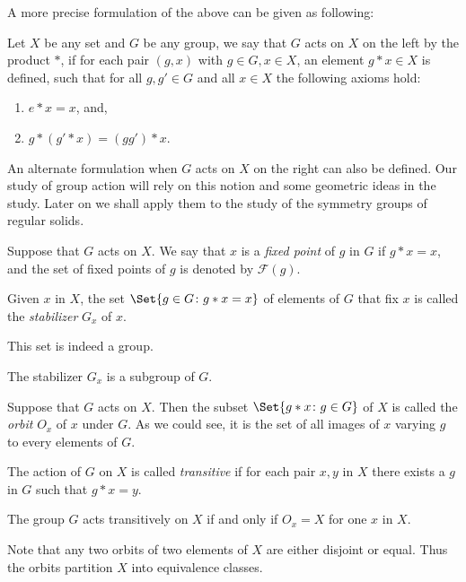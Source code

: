 \documentclass[main.tex]{subfiles}
\begin{document}
		A more precise formulation of the above can be given as following:
		\begin{definition}
			Let $X$ be any set and $G$ be any group, we say that $G$ acts on $X$ on the left by the product $\ast$, if for each pair $(g, x)$ with $g \in G, x \in X$, an element $g\ast x \in X$ is defined, such that for all $g, g' \in G$ and all $x \in X$ the following axioms hold:
			\begin{enumerate}
				\item $e\ast x = x$, and,
				\item $g \ast (g' \ast x) = (g g')\ast x$.
			\end{enumerate}
		\end{definition}
		An alternate formulation when $G$ acts on $X$ on the right can also be defined. Our study of group action will rely on this notion and some geometric ideas in the study. Later on we shall apply them to the study of the symmetry groups of regular solids.
			
			\begin{definition}
				Suppose that $G$ acts on $X$. We say that $x$ is a \textit{fixed point}  of $g$ in $G$ if $g\ast x = x$, and the set of fixed points of $g$ is denoted by $\mathcal{F}(g)$.
			\end{definition}
			\begin{definition}
				Given $x$ in $X$, the set $\Set{g \in G \colon g\ast x = x}$ of elements of $G$ that fix $x$ is called the \textit{stabilizer}  $G_x$ of $x$.
			\end{definition}
			This set is indeed a group.
			\begin{theorem}
				The stabilizer $G_x$ is a subgroup of $G$.
			\end{theorem}
			\begin{definition}
				Suppose that $G$ acts on $X$. Then the subset $\Set{g\ast x \colon g \in G}$ of $X$ is called the \textit{orbit}  $O_x$ of $x$ under $G$. As we could see, it is the set of all images of $x$ varying $g$ to every elements of $G$.
			\end{definition}
			\begin{definition}
				The action of $G$ on $X$ is called \textit{transitive} if for each pair $x, y$ in $X$ there exists a $g$ in $G$ such that $g\ast x = y$.
			\end{definition}
			\begin{lemma}
				The group $G$ acts transitively on $X$ if and only if $O_x = X$	for one $x$ in $X$.	
			\end{lemma}
			Note that any two orbits of two elements of $X$ are either disjoint or equal. Thus the orbits partition $X$ into equivalence classes.
\end{document}
